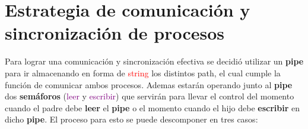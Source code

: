 \documentclass[12pt,letterpaper]{article}
\begin{document}
\section{Estrategia de comunicación y sincronización de procesos}
   Para lograr una comunicación y sincronización efectiva se decidió utilizar un \textbf{pipe} para ir almacenando en forma de \textcolor{red}{string} los distintos path, el cual cumple la función de comunicar ambos procesos. Ademas estarán operando junto al \textbf{pipe} dos \textbf{semáforos} (\textcolor{purple}{leer} y \textcolor{purple}{escribir}) que servirán para llevar el control del momento cuando el padre debe \textbf{leer} el \textbf{pipe} o el momento cuando el hijo debe \textbf{escribir} en dicho \textbf{pipe}.  El proceso para esto se puede descomponer en tres casos:
\end{document}
